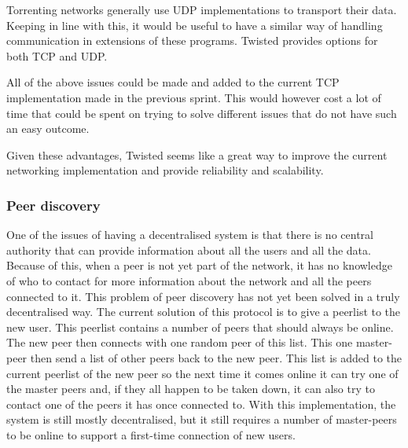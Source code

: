Torrenting networks generally use UDP implementations to transport their data.
Keeping in line with this, it would be useful to have a similar way of handling communication in extensions of these programs.
Twisted provides options for both TCP and UDP.


All of the above issues could be made and added to the current TCP implementation made in the previous sprint.
This would however cost a lot of time that could be spent on trying to solve different issues that do not have such an easy outcome.

Given these advantages, Twisted seems like a great way to improve the current networking implementation and provide reliability and scalability.

\subsubsection{Peer discovery}
One of the issues of having a decentralised system is that there is no central authority that can provide information about all the users and all the data. 
Because of this, when a peer is not yet part of the network, it has no knowledge of who to contact for more information about the network and all the peers connected to it. 
This problem of peer discovery has not yet been solved in a truly decentralised way. 
The current solution of this protocol is to give a peerlist to the new user.
This peerlist contains a number of peers that should always be online. 
The new peer then connects with one random peer of this list. 
This one master-peer then send a list of other peers back to the new peer.
This list is added to the current peerlist of the new peer so the next time it comes online it can try one of the master peers and, if they all happen to be taken down, it can also try to contact one of the peers it has once connected to.
With this implementation, the system is still mostly decentralised, but it still requires a number of master-peers to be online to support a first-time connection of new users.

